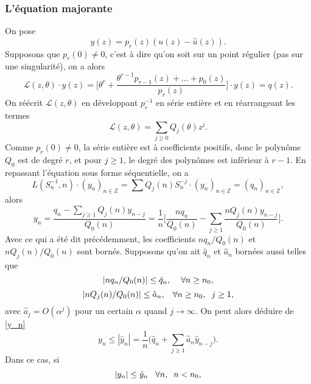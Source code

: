 \documentclass[a4paper,10pt]{article}
\begin{document}
	\subsubsection{L'équation majorante}
	On pose
	\[y(z)=p_r(z)(u(z)-\overset{\sim}{u}(z)).\]
	Supposons que $p_r(0) \neq 0$, c'est à dire qu'on soit sur un point régulier (pas sur une singularité), on a alors 
	\[\mathcal{L}(z,\theta)\cdot y(z)=\Big[\theta^{r}+\frac{\theta^{r-1}p_{r-1}(z)+...+p_0(z)}{p_r(z)}\Big]\cdot y(z)=q(z).\]
	On réécrit $\mathcal{L}(z,\theta)$ en développant $p_r^{-1}$ en série entière et en réarrangeant les termes
	\[\mathcal{L}(z,\theta)=\sum_{j\geq 0} Q_{j}(\theta)z^j.\]
	Comme $p_r(0)\neq 0$, la série entière est à coefficients positifs, donc le polynôme $Q_0$ est de degré $r$, et pour $j \geq 1$, le degré des polynômes est inférieur à $r-1$.
	En repassant l'équation sous forme séquentielle, on a 
	\[L(S_n^{-1},n)\cdot (y_n)_{n \in \mathbb{Z}}=\sum Q_j(n)S_n^{-j} \cdot  (y_n)_{n \in \mathbb{Z}} =(q_n)_{n \in \mathbb{Z}},\]
	alors
	\begin{equation}
		y_n=\frac{q_n-\sum_{j\geq1}Q_j(n)y_{n-j}}{Q_0(n)}= \frac{1}{n}\Big[\frac{nq_n}{Q_0(n)}-\sum_{j\geq1}\frac{nQ_j(n)y_{n-j}}{Q_0(n)}\Big].
		\label{y_n}
	\end{equation}
	Avec ce qui a été dit précédemment, les coefficients $nq_n/Q_0(n)$ et $nQ_j(n)/Q_0(n)$ sont bornés.
	Supposons qu'on ait $\hat{q}_n$ et $\hat{a}_n$ bornées aussi telles que
	\begin{equation}
	|nq_n/Q_0(n)|\leq \hat{q}_n,  \hspace{4mm}\forall n\geq n_0,
	\label{maj1}
	\end{equation}
	\begin{equation}
	|nQ_j(n)/Q_0(n)|\leq \hat{a}_n,\hspace{3mm}  \forall n\geq n_0, \hspace{2mm} j\geq 1,
	\label{maj2}
	\end{equation}
	avec $\hat{a}_j=O(\alpha^j)$ pour un certain $\alpha$ quand $j \rightarrow \infty$. On peut alors déduire de \eqref{y_n}
	\begin{equation}
	y_n\leq|\hat{y}_n|=\frac{1}{n}\Big(\hat{q}_n+\sum_{j\geq1}\hat{a}_{n}\hat{y}_{n-j}\Big).
	\label{majrec}
	\end{equation}
	Dans ce cas, si 
	\begin{equation}
	|y_n|\leq \hat{y}_n \hspace{3mm} \forall n, \hspace{2mm} n<n_0,
	\label{maj3}
	\end{equation}
\end{document}
